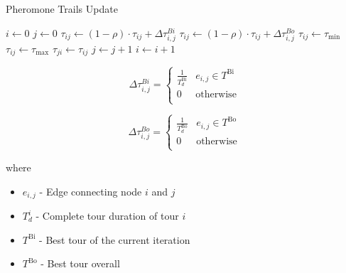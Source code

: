 \begin{homeworkProblem}
\begin{algorithm}[!h]
  \caption{Pheromone Trails Update}\label{update}
  \begin{algorithmic}[1]
     \State $i \gets 0$
      \State $j \gets 0$
          \State $\tau_{ij} \gets (1-\rho)\cdot\tau_{ij}+\Delta\tau_{i,j}^{Bi}$
          \Else
          \State $\tau_{ij} \gets (1-\rho)\cdot\tau_{ij}+\Delta\tau_{i,j}^{Bo}$
          \EndIf
            \State $\tau_{ij} \gets \tau_{\min}$
          \EndIf
            \State $\tau_{ij} \gets \tau_{\max}$
          \EndIf
          \State $\tau_{ji} \gets \tau_{ij}$
          \State $ j \gets j + 1$  
        \EndFor
        \State $ i \gets i + 1$ 
      \EndFor
    \EndProcedure
\end{algorithmic}
\end{algorithm} 

\begin{equation}
  \Delta\tau_{i,j}^{Bi} = \begin{cases}
    \frac{1}{T_{d}^{\text{Bi}}} & e_{i,j} \in T^{\text{Bi}}  \\
    0 & \text{otherwise} \\
  \end{cases}
\end{equation}

\begin{equation}
  \Delta\tau_{i,j}^{Bo} = \begin{cases}
    \frac{1}{T_{d}^{\text{Bo}}} & e_{i,j} \in T^{\text{Bo}}  \\
    0 & \text{otherwise} \\
  \end{cases}
\end{equation}


where
\begin{itemize}
\item $e_{i,j}$ - Edge connecting node $i$ and $j$
\item $T_{d}^{i}$ - Complete tour duration of tour $i$
\item $T^{\text{Bi}}$ - Best tour of the current iteration
\item $T^{\text{Bo}}$ - Best tour overall 
\end{itemize}



\end{homeworkProblem}
